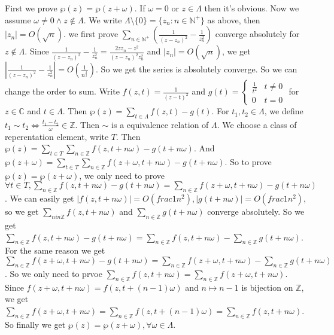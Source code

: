 \documentclass{ctexart}
\begin{document}
\begin{solution}
	First we prove \(\wp(z)=\wp(z+\omega)\). If \(\omega=0\) or \(z \in \Lambda\) then it's obvious. Now we assume \(\omega \neq 0 \wedge z \notin \Lambda\).
	We write \(\Lambda\setminus \{0\}=\{z_n:n \in \mathbb{N}^+\}\) as above, then \(|z_n|=O(\sqrt{n})\).
	we first prove \(\sum_{n \in \mathbb{N}^+} \left(\frac{1}{(z-z_n)^2}-\frac{1}{z_n^2}\right)\) converge absolutely for \(z \notin \Lambda\).
	Since \(\frac{1}{(z-z_n)^2}-\frac{1}{z_n^2}=\frac{2z z_n-z^2}{(z-z_n)^2z_n^2}\) and \(|z_n|=O(\sqrt{n})\),
	we get \(\left|\frac{1}{(z-z_n)^2}-\frac{1}{z_n^2}\right|=O(\frac{1}{n^{ \frac{3}{2}} })\).
	So we get the series is absolutely converge.
	So we can change the order to sum.
	Write \(f(z,t)=\frac{1}{(z-t)^2}\) and \(g(t)=\begin{cases}
		\frac{1}{t^2} & t \neq 0 \\
		0             & t = 0
	\end{cases}\) for \(z \in \mathbb{C}\) and \(t \in \Lambda\). Then \(\wp(z)=\sum_{t \in \Lambda}f(z,t)-g(t)\).
	For \(t_1,t_2 \in \Lambda\), we define \(t_1 \sim t_2 \iff \frac{t_1-t_2}{\omega} \in \mathbb{Z}\).
	Then \(\sim\) is a equivalence relation of \(\Lambda\).
	We choose a class of reperentation element, write \(T\).
	Then \(\wp(z)=\sum_{t \in T}\sum_{n \in \mathbb{Z}}f(z,t+n \omega)-g(t+n \omega)\).
	And \(\wp(z+\omega)=\sum_{t \in T}\sum_{n \in \mathbb{Z}}f(z+\omega,t+n \omega)-g(t+n \omega)\).
	So to prove \(\wp(z)=\wp(z+\omega)\), we only need to prove \(\forall t \in T,\sum_{n \in \mathbb{Z}}f(z,t+n \omega)-g(t+n \omega)=\sum_{n \in \mathbb{Z}}f(z+\omega,t+n \omega)-g(t+n \omega)\).
	We can easily get \(|f(z,t+n \omega)|=O(frac{1}{n^2}),|g(t+n \omega)|=O(frac{1}{n^2})\), so we get \(\sum_{n in \mathbb{Z}}f(z,t+ n \omega)\) and \(\sum_{n \in \mathbb{Z}}g(t+n \omega)\) converge absolutely.
	So we get \(\sum_{n \in \mathbb{Z}}f(z,t+n \omega)-g(t+n \omega)=\sum_{n \in \mathbb{Z}}f(z,t+n \omega)-\sum_{n \in \mathbb{Z}}g(t+n \omega)\).
	For the same reason we get \(\sum_{n \in \mathbb{Z}} f(z+\omega,t+n \omega)-g(t+n \omega)=\sum_{n \in \mathbb{Z}}f(z+\omega,t+n \omega)-\sum_{n \in \mathbb{Z}}g(t+n \omega)\).
	So we only need to prvoe \(\sum_{n \in \mathbb{Z}}f(z,t+n \omega)=\sum_{n \in \mathbb{Z}}f(z+\omega,t+n \omega)\).
	Since \(f(z+\omega,t+n \omega)=f(z,t+(n-1)\omega)\) and \(n \mapsto n-1\) is bijection on \(\mathbb{Z}\), we get
	\(\sum_{n \in \mathbb{Z}}f(z+\omega,t+n \omega)=\sum_{n \in \mathbb{Z}}f(z,t+(n-1)\omega)=\sum_{n \in \mathbb{Z}}f(z,t+n \omega)\).
	So finally we get \(\wp(z)=\wp(z+\omega),\forall \omega \in \Lambda\).


\end{solution}
\end{document}
